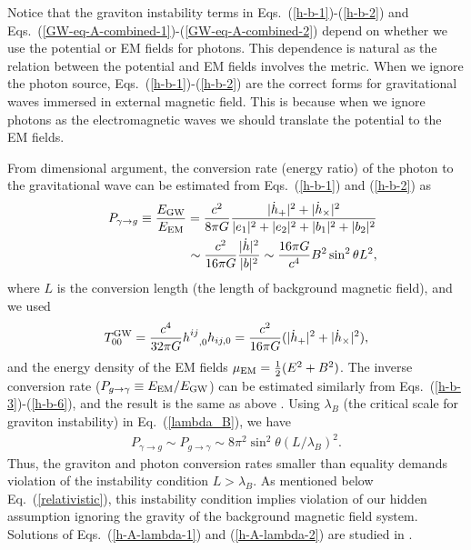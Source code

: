 \documentclass[twocolumn,amsmath,amssymb]{revtex4}
\newcommand{\bea}{\begin{eqnarray}}
\newcommand{\eea}{\end{eqnarray}}
\begin{document}
Notice that the graviton instability terms in Eqs.\ (\ref{h-b-1})-(\ref{h-b-2}) and Eqs.\ (\ref{GW-eq-A-combined-1})-(\ref{GW-eq-A-combined-2}) depend on whether we use the potential or EM fields for photons. This dependence is natural as the relation between the potential and EM fields involves the metric. When we ignore the photon source, Eqs.\ (\ref{h-b-1})-(\ref{h-b-2}) are the correct forms for gravitational waves immersed in external magnetic field. This is because when we ignore photons as the electromagnetic waves we should translate the potential to the EM fields.

From dimensional argument, the conversion rate (energy ratio) of the photon to the gravitational wave can be estimated from Eqs.\ (\ref{h-b-1}) and (\ref{h-b-2}) as \cite{Gertsenshtein-1961, Zeldovich-1973, Zeldovich-Novikov-1983}
\bea
   & & P_{\gamma \rightarrow g}
       \equiv {E_{\rm GW} \over E_{\rm EM}}
       = {c^2 \over 8 \pi G} { |\dot h_+|^2 + |\dot h_\times|^2
       \over |e_1|^2 + |e_2|^2 + |b_1|^2 + |b_2|^2}
   \nonumber \\
   & & \qquad
       \sim {c^2 \over 16 \pi G} { |\dot h|^2
       \over |b|^2}
       \sim {16 \pi G \over c^4} B^2 \sin^2{\theta} L^2,
\eea
where $L$ is the conversion length (the length of background magnetic field), and we used \cite{MTW-1973, Landau-Lifshitz-1975}
\bea
    T^{\rm GW}_{00}
        = {c^4 \over 32 \pi G} h^{ij}_{\;\;\;,0} h_{ij,0}
        = {c^2 \over 16 \pi G} ( |\dot h_+|^2
        + |\dot h_\times|^2 ),
    \label{T00}
\eea
and the energy density of the EM fields $\mu_{\rm EM} = {1 \over 2} ( E^2 + B^2 )$. The inverse conversion rate ($P_{g \rightarrow \gamma} \equiv E_{\rm EM} / E_{\rm GW}$) can be estimated similarly from Eqs.\ (\ref{h-b-3})-(\ref{h-b-6}), and the result is the same as above \cite{Zeldovich-Novikov-1983}. Using $\lambda_B$ (the critical scale for graviton instability) in Eq.\ (\ref{lambda_B}), we have
\bea
   P_{\gamma \rightarrow g}
       \sim P_{g \rightarrow \gamma}
       \sim 8 \pi^2 \sin^2{\theta} (L/\lambda_B)^2.
   \label{P}
\eea
Thus, the graviton and photon conversion rates smaller than equality demands violation of the instability condition $L > \lambda_B$. As mentioned below Eq.\ (\ref{relativistic}), this instability condition implies violation of our hidden assumption ignoring the gravity of the background magnetic field system. Solutions of Eqs.\ (\ref{h-A-lambda-1}) and (\ref{h-A-lambda-2}) are studied in \cite{Ejlli-Thandlam-2019, Ejlli-2020, Fujita-2020, Palessandro-Rothman-2023}.
\end{document}
